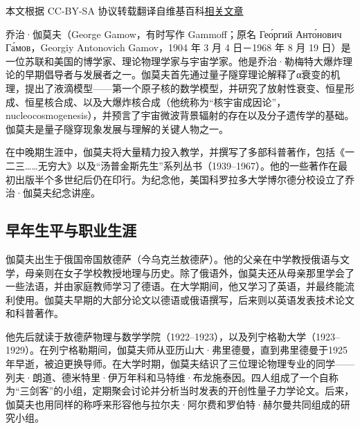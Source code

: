 
本文根据 CC-BY-SA 协议转载翻译自维基百科\href{https://en.wikipedia.org/wiki/George_Gamow}{相关文章}

乔治·伽莫夫（George Gamow，有时写作 Gammoff；原名 Гео́ргий Анто́нович Га́мов，Georgiy Antonovich Gamov，1904 年 3 月 4 日－1968 年 8 月 19 日）是一位苏联和美国的博学家、理论物理学家与宇宙学家。他是乔治·勒梅特大爆炸理论的早期倡导者与发展者之一。伽莫夫首先通过量子隧穿理论解释了α衰变的机理，提出了液滴模型——第一个原子核的数学模型，并研究了放射性衰变、恒星形成、恒星核合成、以及大爆炸核合成（他统称为“核宇宙成因论”，nucleocosmogenesis），并预言了宇宙微波背景辐射的存在以及分子遗传学的基础。伽莫夫是量子隧穿现象发展与理解的关键人物之一。

在中晚期生涯中，伽莫夫将大量精力投入教学，并撰写了多部科普著作，包括《一二三……无穷大》以及“汤普金斯先生”系列丛书（1939–1967）。他的一些著作在最初出版半个多世纪后仍在印行。为纪念他，美国科罗拉多大学博尔德分校设立了乔治·伽莫夫纪念讲座。
\subsection{早年生平与职业生涯}
伽莫夫出生于俄国帝国敖德萨（今乌克兰敖德萨）。他的父亲在中学教授俄语与文学，母亲则在女子学校教授地理与历史。除了俄语外，伽莫夫还从母亲那里学会了一些法语，并由家庭教师学习了德语。在大学期间，他又学习了英语，并最终能流利使用。伽莫夫早期的大部分论文以德语或俄语撰写，后来则以英语发表技术论文和科普著作。

他先后就读于敖德萨物理与数学学院（1922–1923），以及列宁格勒大学（1923–1929）。在列宁格勒期间，伽莫夫师从亚历山大·弗里德曼，直到弗里德曼于1925年早逝，被迫更换导师。在大学时期，伽莫夫结识了三位理论物理专业的同学——列夫·朗道、德米特里·伊万年科和马特维·布龙施泰因。四人组成了一个自称为“三剑客”的小组，定期聚会讨论并分析当时发表的开创性量子力学论文。后来，伽莫夫也用同样的称呼来形容他与拉尔夫·阿尔费和罗伯特·赫尔曼共同组成的研究小组。

